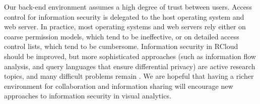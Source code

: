 Our back-end environment assumes a high degree of trust between users.
Access control for information security is delegated to the host
operating system and web server. In practice, most operating
systems and web servers rely either on coarse permission models,
which tend to be ineffective, or on detailed access control
lists, which tend to be cumbersome. 
Information security in RCloud should be improved, but more
sophisticated approaches (such as information flow analysis,
and query languages that ensure differential privacy) are
active research topics, and many difficult problems remain
\cite{Moore:2011:SAF}. We are hopeful that having a richer
environment for collaboration and information sharing will encourage
new approaches to information security in visual analytics.
